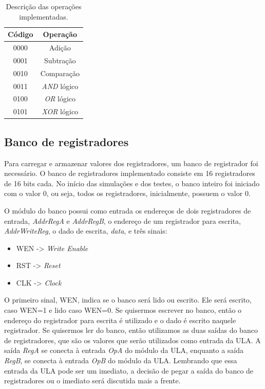 \documentclass[11pt,a4paper,titlepage]{article}
\begin{document}
\begin{table}[h]
\centering
\begin{tabular}{| c | c |}
\hline
Código  & Operação \\
\hline
0000 & Adição\\
\hline
0001 & Subtração\\
\hline
0010 & Comparação\\
\hline
0011 & \textit{AND} lógico\\
\hline
0100 & \textit{OR} lógico\\
\hline
0101 & \textit{XOR} lógico\\
\hline
\end{tabular}
\caption{Descrição das operações implementadas.}
\label{tab:imp}
\end{table}
%

\subsection{Banco de registradores}\label{subsec:imp-br}

Para carregar e armazenar valores dos registradores, um banco de registrador foi necessário.
O banco de registradores implementado consiste em 16 registradores de 16 bits cada.
No início das simulações e dos testes, o banco inteiro foi iniciado com o valor 0, ou seja, todos os registradores, inicialmente, possuem o valor 0.

O módulo do banco possui como entrada os endereços de dois registradores de entrada, \textit{AddrRegA} e \textit{AddrRegB}, o endereço de um registrador para escrita, \textit{AddrWriteReg}, o dado de escrita, \textit{data}, e três sinais:

\begin{itemize}
\item WEN -> \textit{Write Enable}
\item RST -> \textit{Reset}
\item CLK -> \textit{Clock} 
\end{itemize}

O primeiro sinal, WEN, indica se o banco será lido ou escrito.
Ele será escrito, caso WEN=1 e lido caso WEN=0.
Se quisermos escrever no banco, então o endereço do registrador para escrita é utilizado e o dado é escrito naquele registrador.
Se quisermos ler do banco, então utilizamos as duas saídas do banco de registradores, que são os valores que serão utilizados como entrada da ULA.
A saída \textit{RegA} se conecta à entrada \textit{OpA} do módulo da ULA, enquanto a saída \textit{RegB}, se conecta à entrada \textit{OpB} do módulo da ULA.
Lembrando que essa entrada da ULA pode ser um imediato, a decisão de pegar a saída do banco de registradores ou o imediato será discutida mais a frente.
\end{document}
